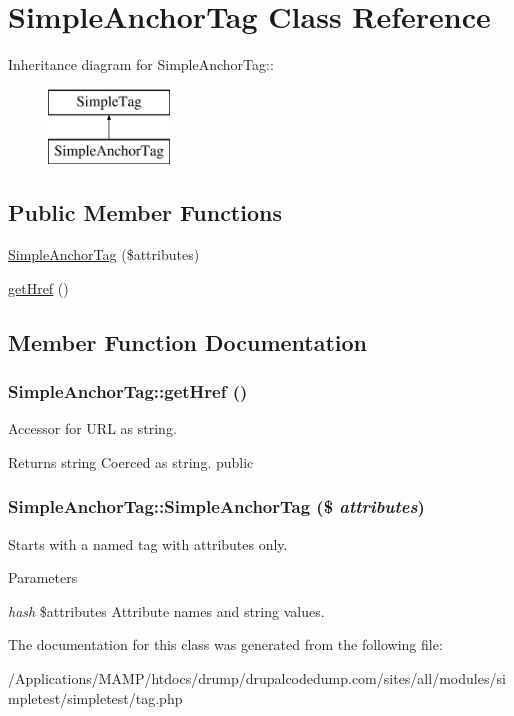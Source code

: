 \hypertarget{class_simple_anchor_tag}{
\section{SimpleAnchorTag Class Reference}
\label{class_simple_anchor_tag}
}
Inheritance diagram for SimpleAnchorTag::\begin{figure}[H]
\begin{center}
\leavevmode
\includegraphics[height=2cm]{class_simple_anchor_tag}
\end{center}
\end{figure}
\subsection*{Public Member Functions}
\begin{DoxyCompactItemize}
\item 
\hyperlink{class_simple_anchor_tag_accc4f2fb09248fb378e105ffbab05b05}{SimpleAnchorTag} (\$attributes)
\item 
\hyperlink{class_simple_anchor_tag_ab615c7ca908f359651e6ee57da006e56}{getHref} ()
\end{DoxyCompactItemize}


\subsection{Member Function Documentation}
\hypertarget{class_simple_anchor_tag_ab615c7ca908f359651e6ee57da006e56}{
\subsubsection[{getHref}]{\setlength{\rightskip}{0pt plus 5cm}SimpleAnchorTag::getHref ()}}
\label{class_simple_anchor_tag_ab615c7ca908f359651e6ee57da006e56}
Accessor for URL as string. \begin{DoxyReturn}{Returns}
string Coerced as string.  public 
\end{DoxyReturn}
\hypertarget{class_simple_anchor_tag_accc4f2fb09248fb378e105ffbab05b05}{
\subsubsection[{SimpleAnchorTag}]{\setlength{\rightskip}{0pt plus 5cm}SimpleAnchorTag::SimpleAnchorTag (\$ {\em attributes})}}
\label{class_simple_anchor_tag_accc4f2fb09248fb378e105ffbab05b05}
Starts with a named tag with attributes only. 
\begin{DoxyParams}{Parameters}
\item[{\em hash}]\$attributes Attribute names and string values. \end{DoxyParams}


The documentation for this class was generated from the following file:\begin{DoxyCompactItemize}
\item 
/Applications/MAMP/htdocs/drump/drupalcodedump.com/sites/all/modules/simpletest/simpletest/tag.php\end{DoxyCompactItemize}
